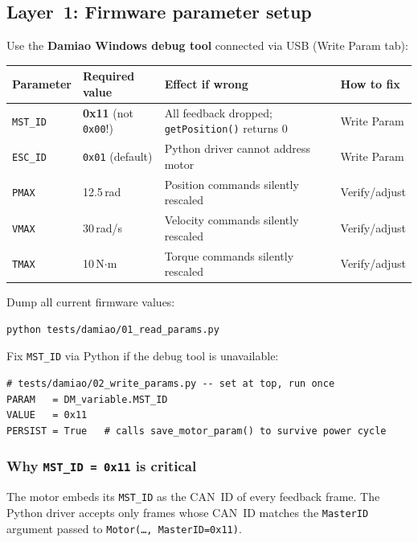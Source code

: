 \documentclass[11pt,a4paper]{article}
\begin{document}
\subsection{Layer~1: Firmware parameter setup}

Use the \textbf{Damiao Windows debug tool} connected via USB (Write Param tab):

\begin{center}\small
\begin{tabular}{llll}
\toprule
Parameter & Required value & Effect if wrong & How to fix\\
\midrule
\texttt{MST\_ID} & \textbf{0x11} (not \texttt{0x00}!) &
  All feedback dropped; \texttt{getPosition()} returns 0 &
  Write Param\\
\texttt{ESC\_ID} & \texttt{0x01} (default) &
  Python driver cannot address motor &
  Write Param\\
\texttt{PMAX} & 12.5\,rad &
  Position commands silently rescaled &
  Verify/adjust\\
\texttt{VMAX} & 30\,rad/s &
  Velocity commands silently rescaled &
  Verify/adjust\\
\texttt{TMAX} & 10\,N$\cdot$m &
  Torque commands silently rescaled &
  Verify/adjust\\
\bottomrule
\end{tabular}
\end{center}

\noindent Dump all current firmware values:
\begin{lstlisting}
python tests/damiao/01_read_params.py
\end{lstlisting}

\noindent Fix \texttt{MST\_ID} via Python if the debug tool is unavailable:
\begin{lstlisting}
# tests/damiao/02_write_params.py -- set at top, run once
PARAM   = DM_variable.MST_ID
VALUE   = 0x11
PERSIST = True   # calls save_motor_param() to survive power cycle
\end{lstlisting}

\subsubsection*{Why \texttt{MST\_ID = 0x11} is critical}

The motor embeds its \texttt{MST\_ID} as the CAN~ID of every feedback
frame.  The Python driver accepts only frames whose CAN~ID matches the
\texttt{MasterID} argument passed to \texttt{Motor(\ldots, MasterID=0x11)}.
\end{document}
